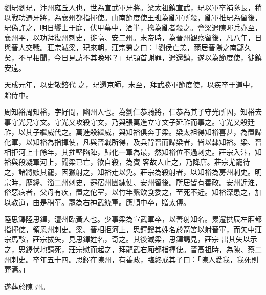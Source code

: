 \begin{pinyinscope}
 劉玘劉玘，汴州雍丘人也，世為宣武軍牙將。梁太祖鎮宣武，玘以軍卒補隊長，稍以戰功遷牙將，為襄州都指揮使。山南節度使王班為亂軍所殺，亂軍推玘為留後，玘偽許之，明日饗士于庭，伏甲幕中，酒半，擒為亂者殺之。會梁遣陳暉兵亦至，襄州平，以功拜復州刺史，徙亳、安二州。末帝時，為晉州觀察留後，凡八年，日與晉人交戰。莊宗滅梁，玘來朝，莊宗勞之曰：「劉侯亡恙，爾居晉陽之南鄙久矣，不早相聞，今日見訪不其晚邪？」玘頓首謝罪，遣還鎮，遂以為節度使，徙鎮安遠。



 天成元年，以史敬鎔代
 之，玘還京師，未至，拜武勝軍節度使，以疾卒于道中，贈侍中。



 周知裕周知裕，字好問，幽州人也。為劉仁恭騎將，仁恭為其子守光所囚，知裕去事守光兄守文。守光又攻殺守文，乃與張萬進立守文子延祚而事之。守光又殺廷祚，以其子繼威代之。萬進殺繼威，與知裕俱奔于梁。梁太祖得知裕喜甚，為置歸化軍，以知裕為指揮使，凡與晉戰所得，及兵背晉而歸梁者，皆以隸知裕。梁、晉相拒河上十餘年，其摧堅陷陣，歸化一軍為最，然知裕位不過刺史。莊宗入汴，知裕與段凝軍河上，聞梁已亡，欲自殺，為賓
 客故人止之，乃降唐。莊宗尤寵待之，諸將嫉其寵，因獵射之，知裕走以免。莊宗為殺射者，以知裕為房州刺史。明宗時，歷絳、淄二州刺史，遷宿州團練使、安州留後。所居皆有善政。安州近淮，俗惡病者，父母有疾，置之佗室，以竹竿繫飲食委之，至死不近。知裕深患之，加以教道，由是稍革。罷為右神武統軍。應順中卒，贈太傅。



 陸思鐸陸思鐸，澶州臨黃人也。少事梁為宣武軍卒，以善射知名。累遷拱辰左廂都指揮使，領恩州刺史。梁、晉相拒河上，思鐸鏤其姓名於箭筈以射晉軍，而矢中莊宗馬鞍，莊宗拔矢，見思鐸姓名，奇之。其後滅梁，思鐸謁見，莊宗
 出其矢以示之，思鐸伏地請死，莊宗慰而起之，拜龍武右廂都指揮使。晉高祖時，為陳、蔡二州刺史。卒年五十四。思鐸在陳州，有善政，臨終戒其子曰：「陳人愛我，我死則葬焉。」



 遂葬於陳
 州。



\end{pinyinscope}